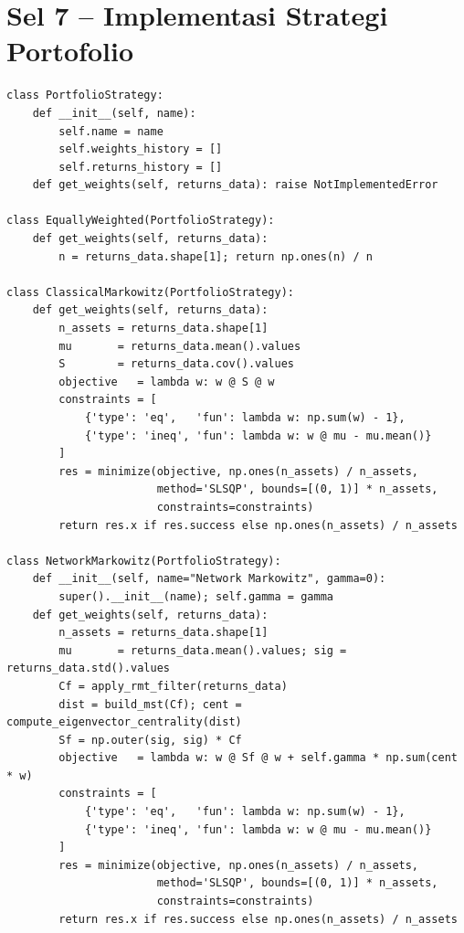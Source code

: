 \documentclass[12pt,a4paper]{article}
\begin{document}
\section{Sel 7 -- Implementasi Strategi Portofolio}

\begin{lstlisting}[caption={Kelas-kelas strategi portofolio}]
class PortfolioStrategy:
    def __init__(self, name):
        self.name = name
        self.weights_history = []
        self.returns_history = []
    def get_weights(self, returns_data): raise NotImplementedError

class EquallyWeighted(PortfolioStrategy):
    def get_weights(self, returns_data):
        n = returns_data.shape[1]; return np.ones(n) / n

class ClassicalMarkowitz(PortfolioStrategy):
    def get_weights(self, returns_data):
        n_assets = returns_data.shape[1]
        mu       = returns_data.mean().values
        S        = returns_data.cov().values
        objective   = lambda w: w @ S @ w
        constraints = [
            {'type': 'eq',   'fun': lambda w: np.sum(w) - 1},
            {'type': 'ineq', 'fun': lambda w: w @ mu - mu.mean()}
        ]
        res = minimize(objective, np.ones(n_assets) / n_assets,
                       method='SLSQP', bounds=[(0, 1)] * n_assets,
                       constraints=constraints)
        return res.x if res.success else np.ones(n_assets) / n_assets

class NetworkMarkowitz(PortfolioStrategy):
    def __init__(self, name="Network Markowitz", gamma=0):
        super().__init__(name); self.gamma = gamma
    def get_weights(self, returns_data):
        n_assets = returns_data.shape[1]
        mu       = returns_data.mean().values; sig = returns_data.std().values
        Cf = apply_rmt_filter(returns_data)
        dist = build_mst(Cf); cent = compute_eigenvector_centrality(dist)
        Sf = np.outer(sig, sig) * Cf
        objective   = lambda w: w @ Sf @ w + self.gamma * np.sum(cent * w)
        constraints = [
            {'type': 'eq',   'fun': lambda w: np.sum(w) - 1},
            {'type': 'ineq', 'fun': lambda w: w @ mu - mu.mean()}
        ]
        res = minimize(objective, np.ones(n_assets) / n_assets,
                       method='SLSQP', bounds=[(0, 1)] * n_assets,
                       constraints=constraints)
        return res.x if res.success else np.ones(n_assets) / n_assets


\end{lstlisting}
\end{document}
